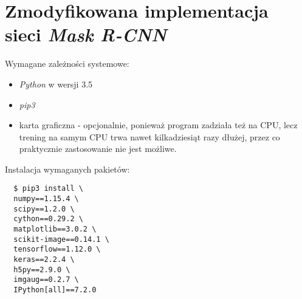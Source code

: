 \section*{Zmodyfikowana implementacja sieci \textit{Mask R-CNN}}

Wymagane zależności systemowe:

\begin{itemize}
  \item \textit{Python} \cite{python} w wersji 3.5
  \item \textit{pip3} \cite{pip}
  \item karta graficzna - opcjonalnie, ponieważ program zadziała też na CPU, lecz trening na samym CPU trwa nawet kilkadziesiąt razy dłużej, przez co praktycznie zastosowanie nie jest możliwe.
\end{itemize}

Instalacja wymaganych pakietów:

\begin{verbatim}
  $ pip3 install \
  numpy==1.15.4 \
  scipy==1.2.0 \
  cython==0.29.2 \
  matplotlib==3.0.2 \
  scikit-image==0.14.1 \
  tensorflow==1.12.0 \
  keras==2.2.4 \
  h5py==2.9.0 \
  imgaug==0.2.7 \
  IPython[all]==7.2.0
\end{verbatim}